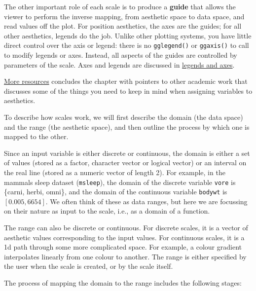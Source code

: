The other important role of each scale is to produce a \textbf{guide}
that allows the viewer to perform the inverse mapping, from aesthetic
space to data space, and read values off the plot. For position
aesthetics, the axes are the guides; for all other aesthetics, legends
do the job. Unlike other plotting systems, you have little direct
control over the axis or legend: there is no \texttt{gglegend()} or
\texttt{ggaxis()} to call to modify legends or axes. Instead, all
aspects of the guides are controlled by parameters of the scale. Axes
and legends are discussed in \hyperref[sec:guides]{legends and axes}.

\hyperref[sec:scale-resources]{More resources} concludes the chapter
with pointers to other academic work that discusses some of the things
you need to keep in mind when assigning variables to aesthetics.


To describe how scales work, we will first describe the domain (the data
space) and the range (the aesthetic space), and then outline the process
by which one is mapped to the other.

Since an input variable is either discrete or continuous, the domain is
either a set of values (stored as a factor, character vector or logical
vector)  or an interval on the real line
(stored as a numeric vector of length 2). For example, in the mammals
sleep dataset (\texttt{msleep}), the domain of the discrete variable
\texttt{vore} is \{carni, herbi, omni\}, and the domain of the
continuous variable \texttt{bodywt} is \([0.005, 6654]\). We often think
of these as data ranges, but here we are focussing on their nature as
input to the scale, i.e., as a domain of a function.

The range can also be discrete or continuous. For discrete scales, it is
a vector of aesthetic values corresponding to the input values. For
continuous scales, it is a 1d path through some more complicated space.
For example, a colour gradient interpolates linearly from one colour to
another. The range is either specified by the user when the scale is
created, or by the scale itself.

The process of mapping the domain to the range includes the following
stages:

